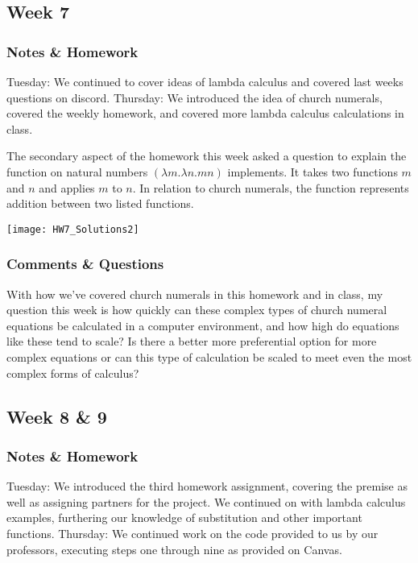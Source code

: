 \documentclass{article}
\theoremstyle{theorem}
\theoremstyle{definition}
\theoremstyle{remark}
\begin{document}
  \subsection{Week 7}

  \subsubsection{Notes \& Homework}
    Tuesday: We continued to cover ideas of lambda calculus and covered last weeks questions on discord. 
    \newline Thursday: We introduced the idea of church numerals, covered the weekly homework, and covered more lambda calculus calculations in class.

    The secondary aspect of the homework this week asked a question to explain the function on natural numbers $(\lambda m. \lambda n. m n)$ implements. It takes two functions $m$ and $n$ and applies $m$ to $n$. In relation to church numerals, the function represents addition between two listed functions. 

  \begin{center} \texttt{[image: HW7\_Solutions2]} \end{center}

  \subsubsection{Comments \& Questions}
    With how we've covered church numerals in this homework and in class, my question this week is how quickly can these complex types of church numeral equations be calculated in a computer environment, and how high do equations like these tend to scale? Is there a better more preferential option for more complex equations or can this type of calculation be scaled to meet even the most complex forms of calculus?

  \subsection{Week 8 \& 9}

  \subsubsection{ Notes \& Homework}
    Tuesday: We introduced the third homework assignment, covering the premise as well as assigning partners for the project. We continued on with lambda calculus examples, furthering our knowledge of substitution and other important functions.
    \newline Thursday: We continued work on the code provided to us by our professors, executing steps one through nine as provided on Canvas.
\end{document}

